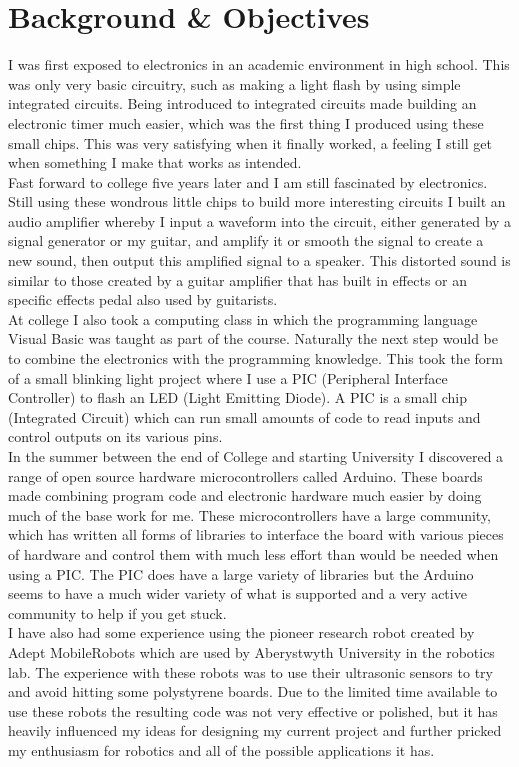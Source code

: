 \chapter{Background \& Objectives}

I was first exposed to electronics in an academic environment in high school.  This was only very basic circuitry, such as making a light flash by using simple integrated circuits.  Being introduced to integrated circuits made building an electronic timer much easier, which was the first thing I produced using these small chips.  This was very satisfying when it finally worked, a feeling I still get when something I make that works as intended.
\\Fast forward to college five years later and I am still fascinated by electronics.  Still using these wondrous little chips to build more interesting circuits I built an audio amplifier whereby I input a waveform into the circuit, either generated by a signal generator or my guitar, and amplify it or smooth the signal to create a new sound, then output this amplified signal to a speaker.  This distorted sound is similar to those created by a guitar amplifier that has built in effects or an specific effects pedal also used by guitarists.
\\At college I also took a computing class in which the programming language Visual Basic was taught as part of the course.  Naturally the next step would be to combine the electronics with the programming knowledge.  This took the form of a small blinking light project where I use a PIC (Peripheral Interface Controller) to flash an LED (Light Emitting Diode).  A PIC is a small chip (Integrated Circuit) which can run small amounts of code to read inputs and control outputs on its various pins.
\\In the summer between the end of College and starting University I discovered a range of open source hardware microcontrollers called Arduino.  These boards made combining program code and electronic hardware much easier by doing much of the base work for me.  These microcontrollers have a large community, which has written all forms of libraries to interface the board with various pieces of hardware and control them with much less effort than would be needed when using a PIC.  The PIC does have a large variety of libraries but the Arduino seems to have a much wider variety of what is supported and a very active community to help if you get stuck.
\\I have also had some experience using the pioneer research robot created by Adept MobileRobots \cite{mobilerobots} which are used by Aberystwyth University in the robotics lab.  The experience with these robots was to use their ultrasonic sensors to try and avoid hitting some polystyrene boards.  Due to the limited time available to use these robots the resulting code was not very effective or polished, but it has heavily influenced my ideas for designing my current project and further pricked my enthusiasm for robotics and all of the possible applications it has.
